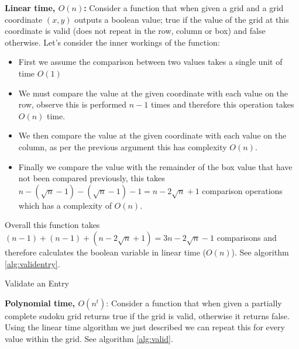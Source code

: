 \documentclass[a4paper,11pt]{report}
\newcounter{row}
\newcounter{col}
\begin{document}
\textbf{Linear time, $O(n)$:} Consider a function that when given a grid and a grid coordinate $(x,y)$ outputs a boolean value; true if the value of the grid at this coordinate is valid (does not repeat in the row, column or box) and false otherwise. Let's consider the inner workings of the function: 
\begin{itemize}
\item First we assume the comparison between two values takes a single unit of time $O(1)$
\item We must compare the value at the given coordinate with each value on the row, observe this is performed $n-1$ times and therefore this operation takes $O(n)$ time.
\item We then compare the value at the given coordinate with each value on the column, as per the previous argument this has complexity $O(n)$.
\item Finally we compare the value with the remainder of the box value that have not been compared previously, this takes $n-(\sqrt{n}-1)-(\sqrt{n}-1)-1= n-2\sqrt{n}+1$ comparison operations which has a complexity of $O(n)$.
\end{itemize}
Overall this function takes $(n-1)+(n-1)+(n-2\sqrt{n}+1) = 3n -2\sqrt{n}-1$ comparisons and therefore calculates the boolean variable in linear time ($O(n)$). See algorithm \ref{alg:validentry}.

\begin{algorithm}
\caption{Validate an Entry}\label{alg:validentry}
\begin{algorithmic}
	 
			\EndIf
		\EndIf
	\EndFor
	 
			\EndIf
		\EndIf
	\EndFor
	 
				\EndIf
			\EndIf
		\EndFor {}
	\EndFor
\EndProcedure
\end{algorithmic}
\end{algorithm}

\textbf{Polynomial time, $O(n^t)$}: Consider a function that when given a partially complete sudoku grid returns true if the grid is valid, otherwise it returns false. Using the linear time algorithm we just described we can repeat this for every value within the grid. See algorithm \ref{alg:valid}.
\end{document}
